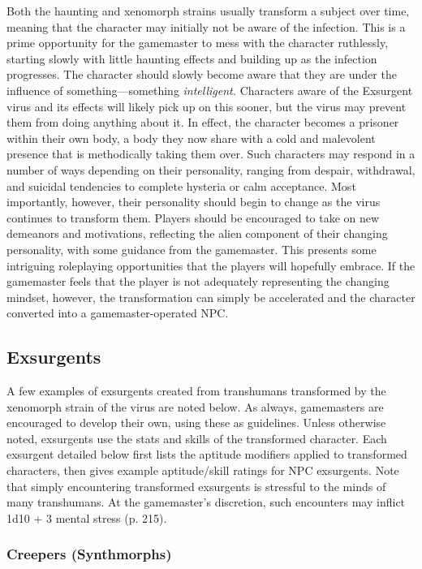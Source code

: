 Both the haunting and xenomorph strains usually transform a subject over time, meaning that the character may initially not be aware of the infection. This is a prime opportunity for the gamemaster to mess with the character ruthlessly, starting slowly with little haunting effects and building up as the infection progresses. The character should slowly become aware that they are under the influence of something—something \textit{intelligent.} Characters aware of the Exsurgent virus and its effects will likely pick up on this sooner, but the virus may prevent them from doing anything about it. In effect, the character becomes a prisoner within their own body, a body they now share with a cold and malevolent presence that is methodically taking them over. Such characters may respond in a number of ways depending on their personality, ranging from despair, withdrawal, and suicidal tendencies to complete hysteria or calm acceptance. Most importantly, however, their personality should begin to change as the virus continues to transform them. Players should be encouraged to take on new demeanors and motivations, reflecting the alien component of their changing personality, with some guidance from the gamemaster. This presents some intriguing roleplaying opportunities that the players will hopefully embrace. If the gamemaster feels that the player is not adequately representing the changing mindset, however, the transformation can simply be accelerated and the character converted into a gamemaster-operated NPC. 

\subsection{Exsurgents } 

A few examples of exsurgents created from transhumans transformed by the xenomorph strain of the virus are noted below. As always, gamemasters are encouraged to develop their own, using these as guidelines. Unless otherwise noted, exsurgents use the stats and skills of the transformed character. Each exsurgent detailed below first lists the aptitude modifiers applied to transformed characters, then gives example aptitude/skill ratings for NPC exsurgents. Note that simply encountering transformed exsurgents is stressful to the minds of many transhumans. At the gamemaster's discretion, such encounters may inflict 1d10 + 3 mental stress (p. 215). 

\subsubsection{Creepers (Synthmorphs)} 


